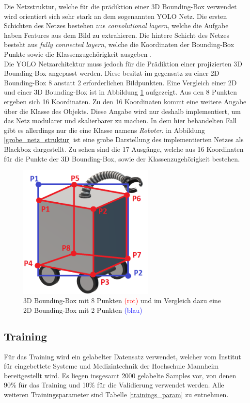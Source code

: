 Die Netzstruktur, welche für die prädiktion einer 3D Bounding-Box verwendet wird orientiert sich sehr stark an dem sogenannten YOLO Netz. Die ersten Schichten des Netzes bestehen aus \textit{convolutional layern}, welche die Aufgabe haben Features aus dem Bild zu extrahieren. Die hintere Schicht des Netzes besteht aus  \textit{fully connected layern}, welche die Koordinaten der Bounding-Box Punkte sowie die Klassenzugehörigkeit  ausgeben \cite{Redmon2016}. \\Die YOLO Netzarchitektur muss jedoch für die Prädiktion einer projizierten 3D Bounding-Box angepasst werden. Diese besitzt im gegensatz zu einer 2D Bounding-Box 8 anstatt 2 erforderlichen Bildpunkten. Eine Vergleich einer 2D und einer 3D Bounding-Box ist in Abbildung \ref{3D_Bounding_roboter} aufgezeigt. Aus den 8 Punkten ergeben sich 16 Koordinaten. Zu den 16 Koordinaten kommt eine weitere Angabe über die Klasse des Objekts. Diese Angabe wird nur deshalb implementiert, um das Netz modularer und skalierbarer zu  machen. In dem hier behandelten Fall gibt es allerdings nur die eine Klasse namens \textit{Roboter}. in Abbildung \ref{grobe_netz_struktur} ist eine grobe Darstellung des implementierten Netzes als Blackbox dargestellt. Zu sehen sind die 17 Ausgänge, welche aus 16 Koordinaten für die Punkte der 3D Bounding-Box, sowie der Klassenzugehörigkeit bestehen.

\begin{figure}[!htb]
  \centering
  \includegraphics[width=6.8cm]{Abb/3d_robotter_mit_boundig_box_2d_vs_3d.PNG}
  \caption{3D Bounding-Box mit 8 Punkten \textcolor{red}{(rot)} und im Vergleich dazu eine 2D Bounding-Box mit 2 Punkten \textcolor{blue}{(blau)} }
  \label{3D_Bounding_roboter}
\end{figure} 

\newpage
\subsection{Training}
Für das Training wird ein gelabelter Datensatz verwendet, welcher vom Institut für eingebettete Systeme und Medizintechnik der Hochschule Mannheim bereitgestellt wird. Es liegen insgesamt 2000 gelabelte Samples vor, von denen 90\% für das Training und 10\% für die Validierung verwendet werden. Alle weiteren Trainingsparameter sind Tabelle \ref{trainings_param} zu entnehmen.\\

